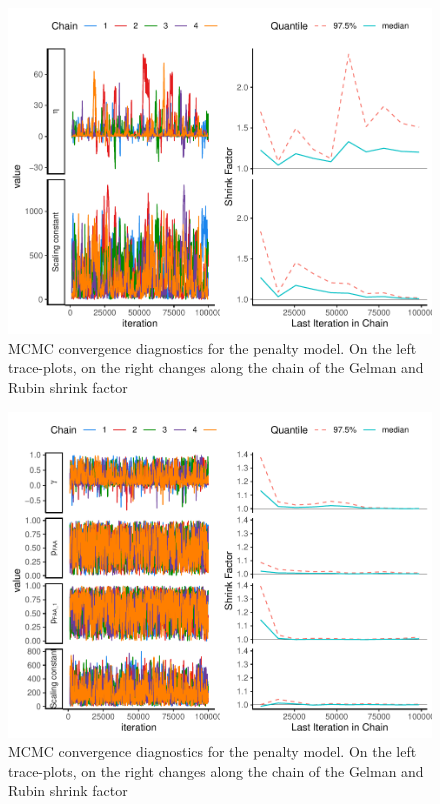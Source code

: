\documentclass[
  12pt,
]{article}
\begin{document}
\begin{figure}
\includegraphics[width=1\linewidth]{manuscript_BE_files/figure-latex/diagNegPAA-1} \caption{MCMC convergence diagnostics for the penalty model. On the left trace-plots, on the right changes along the chain of the Gelman and Rubin shrink factor}\label{fig:diagNegPAA}
\end{figure}
\begin{figure}
\includegraphics[width=1\linewidth]{manuscript_BE_files/figure-latex/diagbothGroup-1} \caption{MCMC convergence diagnostics for the penalty model. On the left trace-plots, on the right changes along the chain of the Gelman and Rubin shrink factor}\label{fig:diagbothGroup}
\end{figure}
\end{document}
